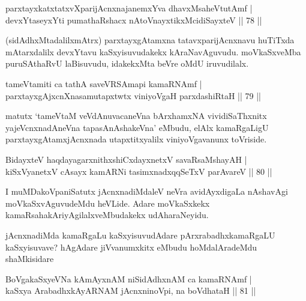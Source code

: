 \begin{shl}
parxtayxkatxtatxvXparijAcnxnajanemxYva dhavxMsaheVtutAmf |\\
devxYtaseyxYti pumathaRshacx nAtoV\s nayxtikxMcidiSayxteV \hfill || 78 ||
\end{shl}

\begin{artha}
(sidAdhxMtadalilxmAtrx) parxtayxgAtamxna tatavxparijAcnxnavu huTiTxda mAtarxdalilx devxYtavu kaSxyisuvudakekx kAraNavAguvudu. moVkaSxveMba puruSAthaRvU laBisuvudu, idakekxMta beVre oMdU iruvudilalx.
\end{artha}

\begin{shl}
tameVtamiti ca tathA saveVRSAmapi kamaRNAmf |\\
parxtayxgAjxcnXnasamutapxtwtx viniyoVgaH parxdashiRtaH \hfill || 79 ||
\end{shl}

\begin{artha}
matutx `tameVtaM veVdAnuvacaneVna bArxhamxNA vividiSaThxnitx yajeVcnxnadAneVna tapasA\s nAshakeVna' eMbudu, elAlx kamaRgaLigU parxtayxgAtamxjAcnxnada utapxtitxyalilx viniyoVgavanunx toVriside.
\end{artha}

\begin{shl}
BidayxteV haqdayagarxnithxshiCxdayxnetxV savaRsaMshayAH |\\
kiSxVyanetxV cAsayx kamARNi tasimxnadxqqSeTxV parAvareV \hfill || 80 ||
\end{shl}

\begin{artha}
I muMDakoVpaniSatutx jAcnxnadiMdaleV neVra avidAyxdigaLa nAshavAgi moVkaSxvAguvudeMdu heVLide. Adare moVkaSxkekx kamaRsahakAriyAgilalxveMbudakekx udAharaNeyidu.
\end{artha}

\begin{artha}
jAcnxnadiMda kamaRgaLu kaSxyisuvudAdare pArxrabadhxkamaRgaLU kaSxyisuvave? hAgAdare jiVvanumxkitx eMbudu hoMdalAradeMdu shaMkisidare
\end{artha}


\begin{shl}
BoVgakaSxyeVNa kAmAyxnAM niSidAdhxnAM ca kamaRNAmf |\\
kaSxya ArabadhxkAyARNAM jAcnxninoV\s pi, na boVdhataH \hfill || 81 ||
\end{shl}

